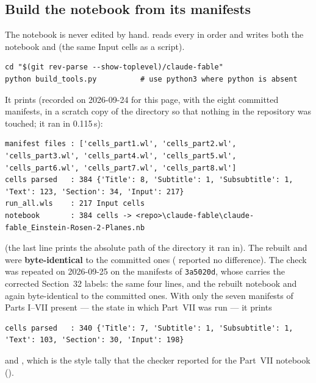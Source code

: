 \subsection{Build the notebook from its manifests}
\label{sec:11.1}

The notebook is never edited by hand.  reads every
 in order and writes both the notebook and  (the
same Input cells as a script).

\begin{Verbatim}
cd "$(git rev-parse --show-toplevel)/claude-fable"
python build_tools.py          # use python3 where python is absent
\end{Verbatim}

It prints (recorded on 2026-09-24 for this page, with the eight committed manifests, in a scratch copy
of the directory so that nothing in the repository was touched; it ran in 0.115\,s):

\begin{Verbatim}[fontsize=\scriptsize]
manifest files : ['cells_part1.wl', 'cells_part2.wl', 'cells_part3.wl', 'cells_part4.wl', 'cells_part5.wl', 'cells_part6.wl', 'cells_part7.wl', 'cells_part8.wl']
cells parsed   : 384 {'Title': 8, 'Subtitle': 1, 'Subsubtitle': 1, 'Text': 123, 'Section': 34, 'Input': 217}
run_all.wls    : 217 Input cells
notebook       : 384 cells -> <repo>\claude-fable\claude-fable_Einstein-Rosen-2-Planes.nb
\end{Verbatim}

(the last line prints the absolute path of the directory it ran in). The rebuilt
 and  were \textbf{byte-identical} to
the committed ones ( reported no difference). The check was repeated on 2026-09-25 on the
manifests of \texttt{3a5020d}, whose  carries the corrected Section~32 labels: the
same four lines, and the rebuilt notebook and  again byte-identical to the committed
ones. With only the seven manifests of Parts
I--VII present --- the state in which Part~VII was run --- it prints
\begin{Verbatim}[fontsize=\scriptsize]
cells parsed   : 340 {'Title': 7, 'Subtitle': 1, 'Subsubtitle': 1, 'Text': 103, 'Section': 30, 'Input': 198}
\end{Verbatim}
and , which is the style tally that the checker reported for
the Part~VII notebook ().


